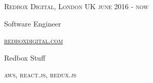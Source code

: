 {
  \textsc{\small{Redbox Digital, London UK
    \hfill
      {\raggedleft
        june 2016 - now
      } \\
    }
  }
  {\raggedright\large {
      Software Engineer
  }}

  \textsc{\small\href{http://www.redboxdigital.com}{redboxdigital.com}}

  \normalsize{\raggedright
    Redbox Stuff
  }

  \textsc{\small{\color{highlight}
    aws,
    react.js,
    redux.js
  }}
}
